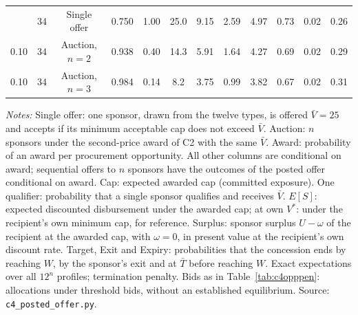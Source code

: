 \begin{table}[htbp]
{\begin{tabular}{cccccccccccc}
\addlinespace
0.10 & 34 & Single offer & 0.750 & 1.00 & 25.0 & 9.15 & 2.59 & 4.97 & 0.73 & 0.02 & 0.26\\
0.10 & 34 & Auction, $n = 2$ & 0.938 & 0.40 & 14.3 & 5.91 & 1.64 & 4.27 & 0.69 & 0.02 & 0.29\\
0.10 & 34 & Auction, $n = 3$ & 0.984 & 0.14 & 8.2 & 3.75 & 0.99 & 3.82 & 0.67 & 0.02 & 0.31\\
\bottomrule\end{tabular}}
\par\smallskip\begin{minipage}{\textwidth}\footnotesize\textit{Notes:} Single offer: one sponsor, drawn from the twelve types, is offered $\bar V = 25$ and accepts if its minimum acceptable cap does not exceed $\bar V$. Auction: $n$ sponsors under the second-price award of C2 with the same $\bar V$. Award: probability of an award per procurement opportunity. All other columns are conditional on award; sequential offers to $n$ sponsors have the outcomes of the posted offer conditional on award. Cap: expected awarded cap (committed exposure). One qualifier: probability that a single sponsor qualifies and receives $\bar V$. $E[S]$: expected discounted disbursement under the awarded cap; at own $V^*$: under the recipient's own minimum cap, for reference. Surplus: sponsor surplus $U - \omega$ of the recipient at the awarded cap, with $\omega = 0$, in present value at the recipient's own discount rate. Target, Exit and Expiry: probabilities that the concession ends by reaching $W$, by the sponsor's exit and at $\bar T$ before reaching $W$. Exact expectations over all $12^n$ profiles; termination penalty. Bids as in Table~\ref{tab:c4opppen}: allocations under threshold bids, without an established equilibrium. Source: \texttt{c4\_posted\_offer.py}.\end{minipage}
\end{table}

